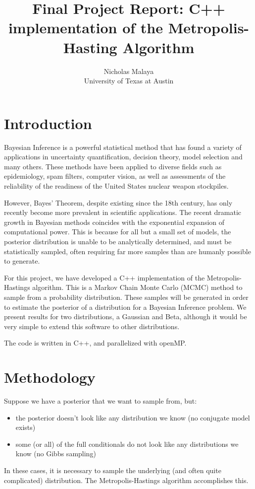 \documentclass{article}
\title{\bf{Final Project Report: C++ implementation of the Metropolis-Hasting Algorithm}}
\author{Nicholas Malaya \\ University of Texas at Austin} \date{}
\begin{document}
\maketitle

\section{Introduction}

Bayesian Inference is a powerful statistical method that has found a
variety of applications in uncertainty quantification, decision theory,
model selection and many others. These methods have been applied to
diverse fields such as epidemiology, spam filters, computer vision, as
well as assessments of the reliability of the readiness of the United
States nuclear weapon stockpiles.  

However, Bayes' Theorem, despite existing since the 18th century, has
only recently become more prevalent in scientific applications. The
recent dramatic growth in Bayesian methods coincides with the
exponential expansion of computational power. This is because for all
but a small set of models, the posterior distribution is unable to be
analytically determined, and must be statistically sampled, often
requiring far more samples than are humanly possible to generate. 

For this project, we have developed a C++ implementation of the
Metropolis-Hastings algorithm. This is a Markov Chain Monte Carlo (MCMC)
method to sample from a probability distribution.  These samples will be
generated in order to estimate the posterior of a distribution for a
Bayesian Inference problem. We present results for two distributions, a Gaussian and Beta, 
although it would be very simple to extend this software to other distributions. 

The code is written in C++, and parallelized with openMP. 
\section{Methodology}
%
%

Suppose we have a posterior that we want to sample from, but:
\begin{itemize}
 \item the posterior doesn't look like any distribution we know (no
       conjugate model exists)
 \item some (or all) of the full conditionals do not look like any
      distributions we know (no Gibbs sampling) 
\end{itemize}
In these cases, it is necessary to sample the underlying (and often
quite complicated) distribution. The Metropolis-Hastings algorithm
accomplishes this. 
\end{document}
